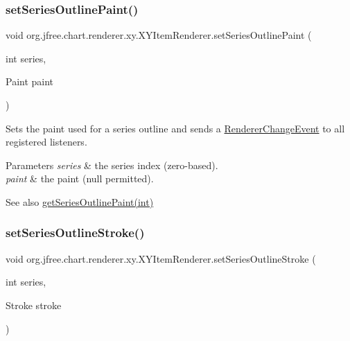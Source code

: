 \subsubsection{\texorpdfstring{set\+Series\+Outline\+Paint()}{setSeriesOutlinePaint()}}
{\footnotesize\ttfamily void org.\+jfree.\+chart.\+renderer.\+xy.\+X\+Y\+Item\+Renderer.\+set\+Series\+Outline\+Paint (\begin{DoxyParamCaption}\item[{int}]{series,  }\item[{Paint}]{paint }\end{DoxyParamCaption})}

Sets the paint used for a series outline and sends a \mbox{\hyperlink{}{Renderer\+Change\+Event}} to all registered listeners.


\begin{DoxyParams}{Parameters}
{\em series} & the series index (zero-\/based). \\
\hline
{\em paint} & the paint ({\ttfamily null} permitted).\\
\hline
\end{DoxyParams}
\begin{DoxySeeAlso}{See also}
\mbox{\hyperlink{interfaceorg_1_1jfree_1_1chart_1_1renderer_1_1xy_1_1_x_y_item_renderer_a6d212ddcea5d74f8723d7caa2d62a34a}{get\+Series\+Outline\+Paint(int)}} 
\end{DoxySeeAlso}
\mbox{\label{interfaceorg_1_1jfree_1_1chart_1_1renderer_1_1xy_1_1_x_y_item_renderer_ad8ab9700d6c753b47123392601e21dd8}} 
\subsubsection{\texorpdfstring{set\+Series\+Outline\+Stroke()}{setSeriesOutlineStroke()}}
{\footnotesize\ttfamily void org.\+jfree.\+chart.\+renderer.\+xy.\+X\+Y\+Item\+Renderer.\+set\+Series\+Outline\+Stroke (\begin{DoxyParamCaption}\item[{int}]{series,  }\item[{Stroke}]{stroke }\end{DoxyParamCaption})}

